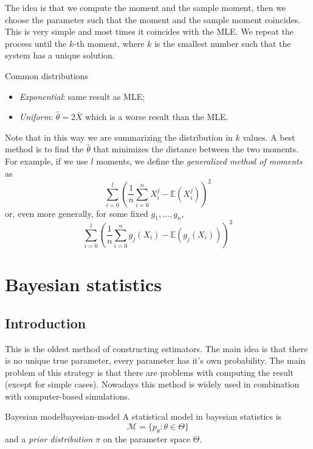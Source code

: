 \documentclass[12pt]{extarticle}
\newcommand{\E}{\mathds{E}}
\begin{document}
The idea is that we compute the moment and the sample moment, then we choose the parameter such that the moment and the sample moment coincides.
This is very simple and most times it coincides with the MLE.
We repeat the process until the $k$-th moment, where $k$ is the smallest number such that the system has a unique solution.

\begin{example}{Common distributions}{}
    \begin{itemize}
        \item \emph{Exponential}: same result as MLE;
        \item \emph{Uniform}: $\hat \theta = 2 \bar X$ which is a worse result than the MLE.
    \end{itemize}
\end{example}

Note that in this way we are summarizing the distribution in $k$ values. A best method is to find the $\hat \theta$ that minimizes the distance between the two moments.
For example, if we use $l$ moments, we define the \emph{generalized method of moments} as
\begin{equation}
    \sum_{i = 0}^l \left( \frac{1}{n} \sum_{i = 0}^n X^j_i - \E(X_i^j) \right)^2
\end{equation}
or, even more generally, for some fixed $g_1, \dots, g_n$,
\begin{equation}
    \sum_{i = 0}^l \left( \frac{1}{n} \sum_{i = 0}^n g_j(X_i) - \E(g_j(X_i)) \right)^2
\end{equation}

\section{Bayesian statistics}

\label{sec:bayes}

\subsection{Introduction}

This is the oldest method of constructing estimators.
The main idea is that there is no unique true parameter, every parameter has it's own probability.
The main problem of this strategy is that there are problems with computing the result (except for simple cases).
Nowadays this method is widely used in combination with computer-based simulations.

\begin{definition}{Bayesian model}{bayesian-model}
    A statistical model in bayesian statistics is
    \begin{equation}
        \mathcal M = \{ p_\theta : \theta \in \Theta \}
    \end{equation}
    and a \emph{prior distribution} $\pi$ on the parameter space $\Theta$.
\end{definition}
\end{document}
